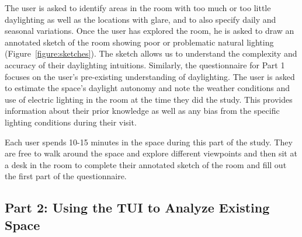 \documentclass[preprint]{elsarticle}
\begin{document}
The user is asked to identify areas in the room with too much or too
little daylighting as well as the locations with glare, and to also
specify daily and seasonal variations.  Once the user has explored the
room, he is asked to draw an annotated sketch of the room showing poor
or problematic natural lighting (Figure~\ref{figure:sketches}).  The
sketch allows us to understand the complexity and accuracy of their
daylighting intuitions.  Similarly, the questionnaire for Part 1
focuses on the user's pre-existing understanding of daylighting.  The user
is asked to estimate the space's daylight autonomy and note the
weather conditions and use of electric lighting in the room at the
time they did the study.  This provides information about their prior
knowledge as well as any bias from the specific lighting conditions
during their visit.

Each user spends 10-15 minutes in the space during this part of the
study.  They are free to walk around the space and explore different
viewpoints and then sit at a desk in the room to complete their
annotated sketch of the room and fill out the first part of the
questionnaire.


\subsection{Part 2: Using the TUI to Analyze Existing Space}
\end{document}
